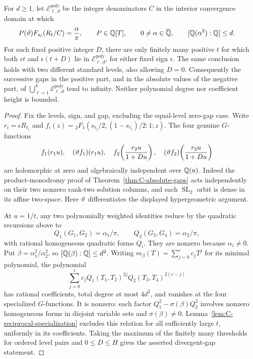 \begin{corollary}
\label{cor:C-polynomial-divergent-gaps}
For $d\ge1$, let $\mathcal E^{\mathrm{poly}}_{\ell,d}$ be the integer
denominators $C$ in the interior convergence domain at which
\[
 P(\vartheta)F_{s_\ell}(R_\ell/C)=\frac\alpha\pi,
 \qquad P\in\mathbb Q[T],\qquad
 0\ne\alpha\in\overline{\mathbb Q},\qquad [\mathbb Q(\alpha^2):\mathbb Q]\le d.
\]
For each fixed positive integer $D$, there are only finitely many
positive $t$ for which both $\epsilon t$ and $\epsilon(t+D)$ lie
in $\mathcal E^{\mathrm{poly}}_{\ell,d}$, for either fixed sign
$\epsilon$. The same conclusion holds with two different standard
levels, also allowing $D=0$. Consequently the successive gaps in the
positive part, and in the absolute values of the negative part, of
$\bigcup_{\ell=1}^4\mathcal E^{\mathrm{poly}}_{\ell,d}$ tend to
infinity. Neither polynomial degree nor coefficient height is bounded.
\end{corollary}
\begin{proof}
Fix the levels, sign, and gap, excluding the equal-level zero-gap
case. Write $r_i=\epsilon R_{\ell_i}$ and
$f_i(z)={}_2F_1(s_{\ell_i}/2,(1-s_{\ell_i})/2;1;z)$.
The four genuine $G$-functions
\[
 f_1(r_1u),\quad (\vartheta f_1)(r_1u),\quad
 f_2\!\left(\frac{r_2u}{1+Du}\right),\quad
 (\vartheta f_2)\!\left(\frac{r_2u}{1+Du}\right)
\]
are holomorphic at zero and algebraically independent over $\mathbb Q(u)$.
Indeed the product-monodromy proof of
Theorem~\ref{thm:C-absolute-gaps} acts independently on their
two nonzero rank-two solution columns, and each
$\operatorname{SL}_2$ orbit is dense in its affine two-space.
Here $\vartheta$ differentiates the displayed hypergeometric argument.

At $u=1/t$, any two polynomially weighted identities reduce by the
quadratic recursions above to
\[
 Q_1(G_1,G_2)=\alpha_1/\pi,\qquad
 Q_2(G_3,G_4)=\alpha_2/\pi,
\]
with rational homogeneous quadratic forms $Q_i$. They are nonzero
because $\alpha_i\ne0$. Put
$\beta=\alpha_1^2/\alpha_2^2$, so $[\mathbb Q(\beta):\mathbb Q]\le d^2$.
Writing $m_\beta(T)=\sum_{j=0}^e c_jT^j$ for its minimal polynomial,
the polynomial
\[
 \sum_{j=0}^e c_jQ_1(T_1,T_2)^{2j}
                    Q_2(T_3,T_4)^{2(e-j)}
\]
has rational coefficients, total degree at most $4d^2$, and vanishes
at the four specialized $G$-functions. It is nonzero: each factor
$Q_1^2-\sigma(\beta)Q_2^2$ involves nonzero homogeneous forms in
disjoint variable sets and $\sigma(\beta)\ne0$.
Lemma~\ref{lem:C-reciprocal-specialization} excludes this relation
for all sufficiently large $t$, uniformly in its coefficients.
Taking the maximum of the finitely many thresholds for ordered level
pairs and $0\le D\le H$ gives the asserted divergent-gap statement.
\end{proof}

